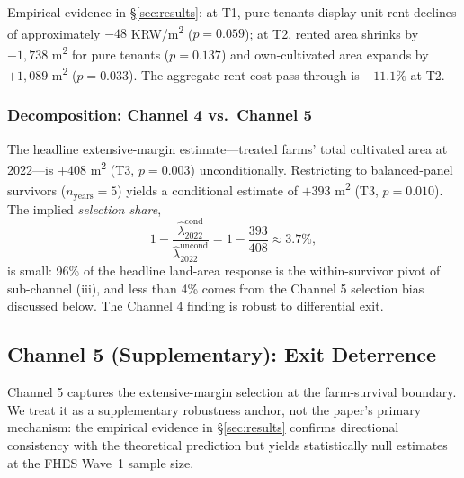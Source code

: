 Empirical evidence in \S\ref{sec:results}: at T1, pure tenants display unit-rent declines of approximately $-48$ KRW/m\textsuperscript{2} ($p = 0.059$); at T2, rented area shrinks by $-1{,}738$ m\textsuperscript{2} for pure tenants ($p = 0.137$) and own-cultivated area expands by $+1{,}089$ m\textsuperscript{2} ($p = 0.033$). The aggregate rent-cost pass-through is $-11.1\%$ at T2.

\subsubsection{Decomposition: Channel 4 vs.\ Channel 5}
\label{sec:ch4-decomp}

The headline extensive-margin estimate---treated farms' total cultivated area at 2022---is $+408$ m\textsuperscript{2} (T3, $p = 0.003$) unconditionally. Restricting to balanced-panel survivors ($n_{\text{years}} = 5$) yields a conditional estimate of $+393$ m\textsuperscript{2} (T3, $p = 0.010$). The implied \emph{selection share},
\begin{equation}
1 - \frac{\hat\lambda_{2022}^{\text{cond}}}{\hat\lambda_{2022}^{\text{uncond}}}
= 1 - \frac{393}{408} \approx 3.7\%,
\label{eq:selection-share}
\end{equation}
is small: 96\% of the headline land-area response is the within-survivor pivot of sub-channel (iii), and less than 4\% comes from the Channel 5 selection bias discussed below. The Channel 4 finding is robust to differential exit.

\subsection{Channel 5 (Supplementary): Exit Deterrence}
\label{sec:ch5-exit}

Channel 5 captures the extensive-margin selection at the farm-survival boundary. We treat it as a supplementary robustness anchor, not the paper's primary mechanism: the empirical evidence in \S\ref{sec:results} confirms directional consistency with the theoretical prediction but yields statistically null estimates at the FHES Wave~1 sample size.

